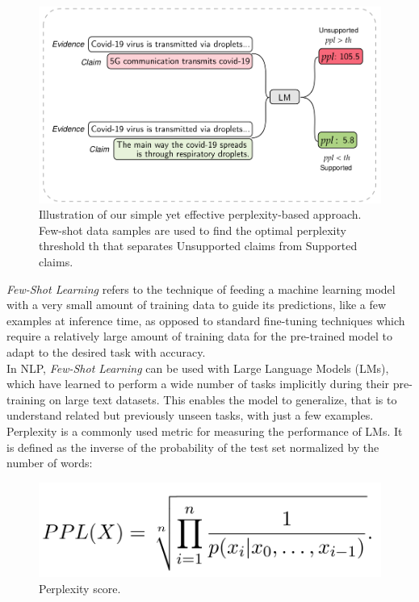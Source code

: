 \documentclass[10pt, english]{report}
\begin{document}
\begin{figure}[H]
	\centering
	\includegraphics[scale=0.3]{img/perplexity_example.png}
	\caption{Illustration of our simple yet effective perplexity-based approach. Few-shot data samples are used to find the optimal perplexity threshold th that separates Unsupported claims from Supported claims. \cite{lee2021towards}}
\end{figure}

\textit{Few-Shot Learning} refers to the technique of feeding a machine learning model with a very small amount of training data to guide its predictions, like a few examples at inference time, as opposed to standard fine-tuning techniques which require a relatively large amount of training data for the pre-trained model to adapt to the desired task with accuracy.\\
In NLP, \textit{Few-Shot Learning} can be used with Large Language Models (LMs), which have learned to perform a wide number of tasks implicitly during their pre-training on large text datasets. This enables the model to generalize, that is to understand related but previously unseen tasks, with just a few examples.\\

Perplexity is a commonly used metric for measuring the performance of LMs. It is defined as the inverse of the probability of the test set normalized by the number of words:

\begin{figure}[H]
	\centering
	\includegraphics[scale=0.2]{img/perplexity_equation.png}
	\caption{Perplexity score. \cite{lee2021towards}}
\end{figure}
\end{document}
